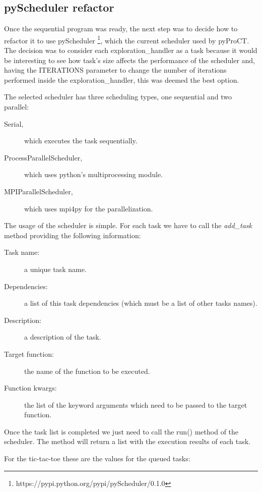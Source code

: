\subsection{pyScheduler refactor}

Once the sequential program was ready, the next step was to decide how to refactor it to use pyScheduler \footnote{https://pypi.python.org/pypi/pyScheduler/0.1.0}, which the current scheduler used by pyProCT. The decision was to consider each exploration\_handler as a task because it would be interesting to see how task's size affects the performance of the scheduler and, having the ITERATIONS parameter to change the number of iterations performed inside the exploration\_handler, this was deemed the best option. 

The selected scheduler has three scheduling types, one sequential and two parallel: 

\begin{description}
\item [Serial,] which executes the task sequentially.
\item [ProcessParallelScheduler,] which uses python's multiprocessing module.
\item [MPIParallelScheduler,] which uses mpi4py for the parallelization.
\end{description}

The usage of the scheduler is simple. For each task we have to call the \textit{add\_task} method providing the following information:

\begin{description}
\item [Task name:] a unique task name.
\item [Dependencies:] a list of this task dependencies (which must be a list of other tasks names).
\item [Description:] a description of the task.
\item [Target function:] the name of the function to be executed.
\item [Function kwargs:] the list of the keyword arguments which need to be passed to the target function.
\end{description}

Once the task list is completed we just need to call the run() method of the scheduler. The method will return a list with the execution results of each task.

For the tic-tac-toe these are the values for the queued tasks:

